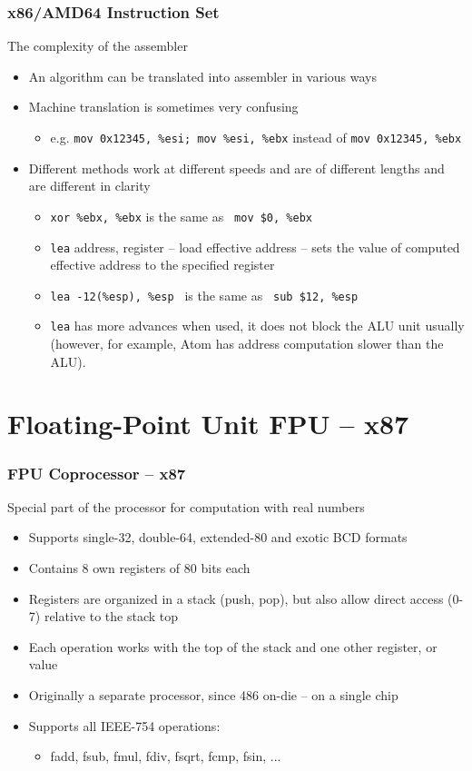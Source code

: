 \documentclass{beamer}
\begin{document}
\begin{frame}
\frametitle{x86/AMD64 Instruction Set}
The complexity of the assembler
\begin{itemize}
\item An algorithm can be translated into assembler in various ways
\item Machine translation is sometimes very confusing
\begin{itemize}
\item e.g. \texttt{mov 0x12345, \%esi; mov \%esi, \%ebx} instead of \texttt{mov 0x12345, \%ebx}
\end{itemize}
\item Different methods work at different speeds and are of different lengths and are different in clarity
\begin{itemize}
\item \texttt{xor \%ebx, \%ebx} is the same as \texttt{ mov \$0, \%ebx}
\item \texttt{lea} address, register -- load effective address -- sets the value of computed effective address to the specified register
\item \texttt{lea -12(\%esp), \%esp } is the same as \texttt{ sub \$12, \%esp}
\item \texttt{lea} has more advances when used, it does not block the ALU unit usually (however, for example, Atom has address computation slower than the ALU).
\end{itemize}
\end{itemize}
\end{frame}

\section{Floating-Point Unit FPU -- x87}


\begin{frame}
\frametitle{FPU Coprocessor -- x87}
Special part of the processor for computation with real numbers
\begin{itemize}
\item Supports single-32, double-64, extended-80 and exotic BCD formats
\item Contains 8 own registers of 80 bits each
\item Registers are organized in a stack (push, pop), but also allow direct access (0-7) relative to the stack top
\item Each operation works with the top of the stack and one other register, or value
\item Originally a separate processor, since 486 on-die -- on a single chip
\item Supports all IEEE-754 operations:
\begin{itemize}
\item fadd, fsub, fmul, fdiv, fsqrt, fcmp, fsin, ...
\end{itemize}
\end{itemize}
\end{frame}
\end{document}
